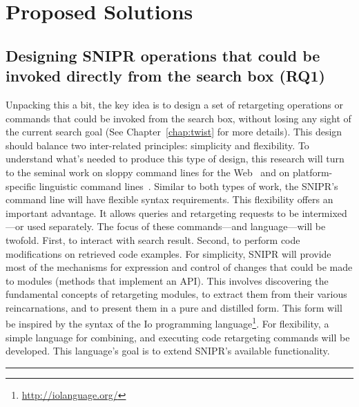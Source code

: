 \chapter{Proposed Solutions}{}
\label{sec:solutions}

\section{Designing \uppercase{SnipR} operations that could be invoked directly from the search box (RQ1)}
\label{sec:rq1}
Unpacking this a bit, the key idea is to design a set of retargeting operations or commands that could be invoked from the search box, without losing any sight of the current search goal (See Chapter~\ref{chap:twist} for more details). This design should balance two inter-related principles: simplicity and flexibility. To understand what's needed to produce this type of design, this research will turn to the seminal work on sloppy command lines for the Web~\cite{Little:2007dh, Miller:2008ge} and on platform-specific linguistic command lines~\cite{Raskin:2008wb}. Similar to both types of work, the \uppercase{SnipR}'s command line will have flexible syntax requirements. This flexibility offers an important advantage. It allows queries and retargeting requests to be intermixed---or used separately. The focus of these commands---and language---will be twofold. First, to interact with search result. Second, to perform code modifications on retrieved code examples. For simplicity, SNIPR will provide most of the mechanisms for expression and control of changes that could be made to modules (methods that implement an API). This involves discovering the fundamental concepts of retargeting modules, to extract them from their various reincarnations, and to present them in a pure and distilled form. This form will be inspired by the syntax of the Io programming language\footnote{\url{http://iolanguage.org/}}. For flexibility, a simple language for combining, and executing code retargeting commands will be developed. This language's goal is to extend \uppercase{SnipR}'s available functionality. 

\fancybreak{\pfbreakdisplay}

